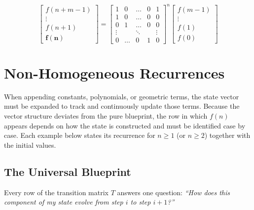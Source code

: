\documentclass[11pt]{article}
\begin{document}
\[
\begin{bmatrix} f(n+m-1) \\ \vdots \\ f(n+1) \\ \mathbf{f(n)} \end{bmatrix} = 
\begin{bmatrix} 
1 & 0 & \dots & 0 & 1 \\ 
1 & 0 & \dots & 0 & 0 \\ 
0 & 1 & \dots & 0 & 0 \\ 
\vdots & & \ddots & & \vdots \\ 
0 & \dots & 0 & 1 & 0 
\end{bmatrix}^n 
\begin{bmatrix} f(m-1) \\ \vdots \\ f(1) \\ f(0) \end{bmatrix}
\]

\newpage
\section{Non-Homogeneous Recurrences}
When appending constants, polynomials, or geometric terms, the state vector must be expanded to track and continuously update those terms. Because the vector structure deviates from the pure blueprint, the row in which $f(n)$ appears depends on how the state is constructed and must be identified case by case. Each example below states its recurrence for $n \ge 1$ (or $n \ge 2$) together with the initial values.

\subsection{The Universal Blueprint}

Every row of the transition matrix $T$ answers one question: \textit{``How does this component of my state evolve from step $i$ to step $i+1$?''}
\end{document}
